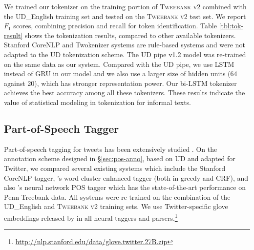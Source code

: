 \documentclass[11pt,a4paper]{article}
\newcommand{\yicomment}[1]{\textcolor{gray}{[#1 ---\textsc{Yi}]}}
\begin{document}
We trained our tokenizer on the training portion of
\textsc{Tweebank v2} combined with the UD\_English training set
and tested on the \textsc{Tweebank v2} test set. 
We report $F_1$ scores, combining precision and recall for token identification. Table \ref{tbl:tok-result} shows the
tokenization results, compared to  other available tokenizers. 
 Stanford CoreNLP \cite{manning-EtAl:2014:P14-5} and Twokenizer
\cite{ICWSM101540} systems are rule-based systems and were not adapted
to the UD tokenization scheme.
The UD pipe v1.2
\cite{straka-strakova:2017:K17-3} model was re-trained on the same
data as our system. Compared with the UD pipe, we use LSTM
instead of GRU in our model and we also use a larger size of hidden units (64 against 20),
which has stronger representation power. 
Our bi-LSTM tokenizer achieves the best accuracy among all these
tokenizers.  These results indicate the value of statistical modeling
in tokenization for informal texts.

\subsection{Part-of-Speech Tagger}


Part-of-speech tagging for tweets has been extensively studied \cite{ritter-EtAl:2011:EMNLP,gimpel-EtAl:2011:ACL-HLT2011,derczynski-EtAl:2013:RANLP-2013,owoputi-EtAl:2013:NAACL-HLT,gui-EtAl:2017:EMNLP20172}.
On the annotation scheme designed in \S\ref{sec:pos-anno}, based on UD and adapted for
Twitter, we compared several existing systems which include the Stanford CoreNLP tagger, 
\citet{owoputi-EtAl:2013:NAACL-HLT}'s word cluster enhanced tagger (both in greedy and CRF), and 
also \citet{ma-hovy:2016:P16-1}'s neural network POS tagger 
which has the state-of-the-art performance  on Penn Treebank data.
All systems were re-trained on the combination of the UD\_English and 
\textsc{Tweebank v2} training sets. We use Twitter-specific glove embeddings released by
\citet{pennington-socher-manning:2014:EMNLP2014} in all neural taggers
and parsers.\footnote{\url{http://nlp.stanford.edu/data/glove.twitter.27B.zip}}
\end{document}
